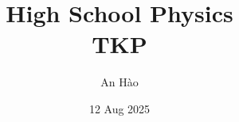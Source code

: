 \usepackage[utf8]{inputenc}
\usepackage[T1]{fontenc}

\usepackage{blindtext} %
\usepackage{color,soul} %
\usepackage[dvipsnames]{xcolor} %
\usepackage{tcolorbox}

\usepackage{amsmath, booktabs}
\usepackage{amsthm}
\usepackage{amssymb}
\usepackage{amsfonts}
\usepackage{mathtools}

\usepackage{siunitx}

\usepackage{graphicx}
\usepackage{subcaption}
\graphicspath{ {./figures/} }


\usepackage{tikz}



\usepackage[
  left=20mm,
  right=20mm,
  top=25mm,
  bottom=25mm,
  headsep=10mm,
  footskip=15mm,
]{geometry}

\usepackage{fancyhdr}
\usepackage{lastpage}

\pagestyle{fancy}
\fancyhf{} %
\renewcommand{\headrulewidth}{0pt} %

\lhead{\leftmark}
\rhead{\thepage}

\renewcommand{\baselinestretch}{1.2}

\setlength{\parskip}{1.3mm}

\usepackage[vietnamese=nohyphenation]{hyphsubst} %
\usepackage[vietnamese]{babel}

\usepackage{hyperref} %
    

\usepackage[Glenn]{fncychap}

\usepackage{subfiles} %

\title{
	{High School Physics}\\
	{\large TKP}\\
}
\author{An Hào}
\date{12 Aug 2025}
